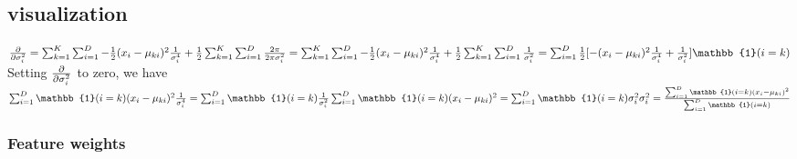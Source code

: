 \documentclass[letterpaper]{article}
\begin{document}
\subsection{visualization}
$
\pdv{}{\sigma_{i} ^2} = \sum_{k = 1}^{K} \sum_{i = 1}^{D} - \frac{1}{2}(x_{i} - \mu_{ki})^2 \frac{1}{\sigma_{i} ^4} + \frac{1}{2}\sum_{k = 1}^{K} \sum_{i = 1}^{D} \frac{2 \pi}{2\pi \sigma_{i} ^2}\\
=  \sum_{k = 1}^{K} \sum_{i = 1}^{D} - \frac{1}{2}(x_{i} - \mu_{ki})^2 \frac{1}{\sigma_{i} ^4} + \frac{1}{2}\sum_{k = 1}^{K} \sum_{i = 1}^{D} \frac{1}{ \sigma_{i} ^2}\\
 =  \sum_{i = 1}^{D} \frac{1}{2} [ -(x_{i} - \mu_{ki})^2 \frac{1}{\sigma_{i} ^4} + \frac{1}{\sigma_{i} ^2}]{\mathbb{1} ( i = k)}\\
 $
Setting $\pdv{}{\sigma_{i} ^2}$ to zero, we have\\
$
\sum_{i = 1}^{D} {\mathbb{1} ( i = k)} (x_{i} - \mu_{ki})^2 \frac{1}{\sigma_{i} ^4}
= \sum_{i=1}^{D} {\mathbb{1} ( i = k)} \frac{1}{\sigma_{i} ^2}\\
\sum_{i = 1}^{D} {\mathbb{1} ( i = k)} (x_{i} - \mu_{ki})^2 
= \sum_{i=1}^{D} {\mathbb{1} ( i = k)} \sigma_{i} ^2\\
\sigma_{i} ^2 = \frac{\sum_{i = 1}^{D} {\mathbb{1} ( i = k)} (x_{i} - \mu_{ki})^2}{\sum_{i=1}^{D} {\mathbb{1} ( i = k)}}
$


\subsubsection{Feature weights}











\end{document}
